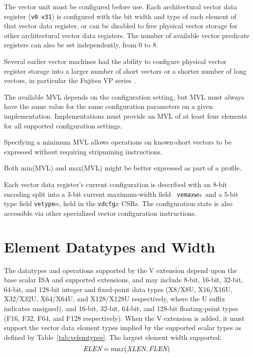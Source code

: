 The vector unit must be configured before use.  Each architectural
vector data register ({\tt v0}--{\tt v31}) is configured with the bit
width and type of each element of that vector data register, or can be
disabled to free physical vector storage for other architectural
vector data registers.  The number of available vector predicate
registers can also be set independently, from 0 to 8.

\begin{commentary}
  Several earlier vector machines had the ability to configure
  physical vector register storage into a larger number of short
   vectors or a shorter number of long vectors, in particular the
  Fujitsu VP series~\cite{vp200}.
\end{commentary}

The available MVL depends on the configuration setting, but MVL must
always have the same value for the same configuration parameters on a
given implementation.  Implementations must provide an MVL of at least
four elements for all supported configuration settings.

\begin{commentary}
  Specifying a minimum MVL allows operations on known-short vectors to
  be expressed without requiring stripmining instructions.
\end{commentary}

\begin{discussion}
Both min(MVL) and max(MVL) might be better expressed as part of a
profile.
\end{discussion}

Each vector data register's current configuration is described with an
8-bit encoding split into a 3-bit current maximum-width field {\tt
  vemaxw}$n$\, and a 5-bit type field {\tt vetype}$n$, held in the
{\tt vdcfg}$x$ CSRs.  The configuration state is also accessible via
other specialized vector configuration instructions.

\section{Element Datatypes and Width}

The datatypes and operations supported by the V extension depend upon
the base scalar ISA and supported extensions, and may include 8-bit,
16-bit, 32-bit, 64-bit, and 128-bit integer and fixed-point data types
(X8/X8U, X16/X16U, X32/X32U, X64/X64U, and X128/X128U respectively,
where the U suffix indicates unsigned), and 16-bit, 32-bit, 64-bit,
and 128-bit floating-point types (F16, F32, F64, and F128
respectively).  When the V extension is added, it must support the
vector data element types implied by the supported scalar types as
defined by Table~\ref{tab:velemtypes}.  The largest element width
supported:
\[ \mbox{\em ELEN} = max(\mbox{\em XLEN}, \mbox{\em FLEN}) \]


